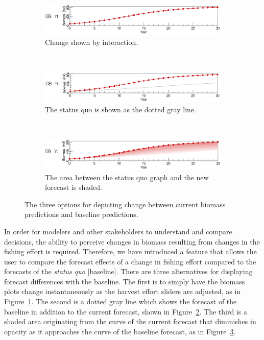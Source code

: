 \begin{figure}
\centering
	\begin{subfigure}[b]{0.8\textwidth}
		\centering
		\includegraphics[width=11cm]{figures/eps/msprod_change_none.eps}
		\caption{Change shown by interaction.}	
		\label{fig:changeNone}
	\end{subfigure}	\\
	\begin{subfigure}[b]{0.8\textwidth}
		\centering
		\includegraphics[width=11cm]{figures/eps/msprod_change_line.eps}
		\caption{The status quo is shown as the dotted gray line.}
		\label{fig:changeLine}
	\end{subfigure} \\
	\begin{subfigure}[b]{0.8\textwidth}
		\centering
		\includegraphics[width=11cm]{figures/eps/msprod_change_blend.eps}
		\caption{The area between the status quo graph and the new forecast is shaded.}
		\label{fig:changeBlend}
	\end{subfigure}
	\caption{The three options for depicting change between current biomass predictions and baseline predictions.}
	\label{fig:changeTypes}
\end{figure}

In order for modelers and other stakeholders to understand and compare decisions, the ability to perceive changes in biomass resulting from changes in the fishing effort is required.  Therefore, we have introduced a feature that allows the user to compare the forecast effects of a change in fishing effort compared to the forecasts of the \textit{status quo} [baseline]. There are three alternatives for displaying forecast differences with the baseline.  The first is to simply have the biomass plots change instantaneously as the harvest effort sliders are adjusted, as in Figure~\ref{fig:changeNone}.  The second is a dotted gray line which shows the forecast of the baseline in addition to the current forecast, shown in Figure~\ref{fig:changeLine}.  The third is a shaded area originating from the curve of the current forecast that diminishes in opacity as it approaches the curve of the baseline forecast, as in Figure~\ref{fig:changeBlend}.

